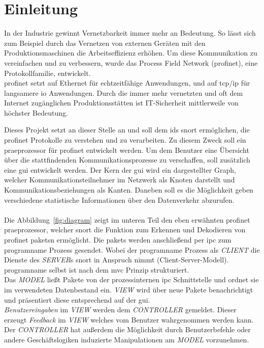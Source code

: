 \chapter{Einleitung}

In der Industrie gewinnt Vernetzbarkeit immer mehr an Bedeutung. So lässt sich zum Beispiel durch das Vernetzen von externen Geräten mit den Produktionsmaschinen die Arbeitseffizienz erhöhen. Um diese Kommunikation zu vereinfachen und zu verbessern, wurde das Process Field Network (\gls{profinet}), eine Protokollfamilie, entwickelt.\\
\gls{profinet} setzt auf Ethernet für echtzeitfähige Anwendungen, und auf \gls{tcp}/\gls{ip} für langsamere \gls{io} Anwendungen. Durch die immer mehr vernetzten und oft dem Internet zugänglichen Produktionsstätten ist IT-Sicherheit mittlerweile von höchster Bedeutung. \par
Dieses Projekt setzt an dieser Stelle an und soll dem \gls{ids} \gls{snort} ermöglichen, die \gls{profinet} Protokolle zu verstehen und zu verarbeiten. Zu diesem Zweck soll ein \gls{praeprozessor} für \gls{profinet} entwickelt werden. Um dem Benutzer eine Übersicht über die stattfindenden Kommunikationsprozesse zu verschaffen, soll zusätzlich eine \gls{gui} entwickelt werden. Der Kern der \gls{gui} wird ein dargestellter Graph, welcher Kommunikationsteilnehmer im Netzwerk als Knoten darstellt und Kommunikationsbeziehungen als Kanten. Daneben soll es die Möglichkeit geben verschiedene statistische Informationen über den Datenverkehr abzurufen.\\\\
Die Abbildung~\ref{fig:diagram} zeigt im unteren Teil den eben erwähnten \gls{profinet} \gls{praeprozessor}, welcher \gls{snort} die Funktion zum Erkennen und Dekodieren von \gls{profinet} \glspl{paket}n ermöglicht. Die \glspl{paket} werden anschließend per \gls{ipc} zum \gls{programname} Prozess gesendet. Wobei der \gls{programname} Prozess als \textit{CLIENT} die Dienste des \textit{SERVER}s \gls{snort} in Anspruch nimmt (Client-Server-Modell).\\
\Gls{programname} selbst ist nach dem \gls{mvc} Prinzip strukturiert.\\
Das \textit{MODEL} ließt Pakete von der prozessinternen \gls{ipc} Schnittstelle und ordnet sie im verwendeten Datenbestand ein. \textit{VIEW} wird über neue Pakete benachrichtigt und präsentiert diese entsprechend auf der \gls{gui}.\\
\textit{Benutzereingaben} im \textit{VIEW} werden dem \textit{CONTROLLER} gemeldet. Dieser erzeugt \textit{Feedback} im \textit{VIEW} welches vom Benutzer wahrgenommen werden kann. Der \textit{CONTROLLER} hat außerdem die Möglichkeit durch Benutzerbefehle oder andere Geschäftslogiken induzierte Manipulationen am \textit{MODEL} vorzunehmen.

